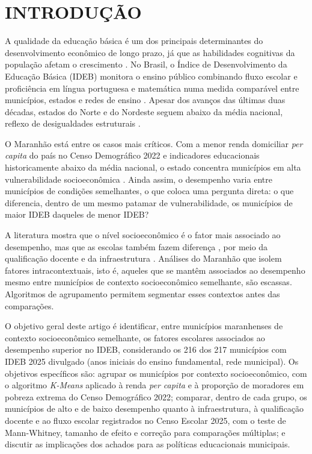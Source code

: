 \section{INTRODUÇÃO}
\label{sec:intro}

A qualidade da educação básica é um dos principais determinantes do desenvolvimento econômico de longo prazo, já que as habilidades cognitivas da população afetam o crescimento \parencite{hanushek2012}. No Brasil, o Índice de Desenvolvimento da Educação Básica (IDEB) monitora o ensino público combinando fluxo escolar e proficiência em língua portuguesa e matemática numa medida comparável entre municípios, estados e redes de ensino \parencite{fernandes2007}. Apesar dos avanços das últimas duas décadas, estados do Norte e do Nordeste seguem abaixo da média nacional, reflexo de desigualdades estruturais \parencite{inep2025}.

O Maranhão está entre os casos mais críticos. Com a menor renda domiciliar \textit{per capita} do país no Censo Demográfico 2022 e indicadores educacionais historicamente abaixo da média nacional, o estado concentra municípios em alta vulnerabilidade socioeconômica \parencite{ibge2022, inep2025}. Ainda assim, o desempenho varia entre municípios de condições semelhantes, o que coloca uma pergunta direta: o que diferencia, dentro de um mesmo patamar de vulnerabilidade, os municípios de maior IDEB daqueles de menor IDEB?

A literatura mostra que o nível socioeconômico é o fator mais associado ao desempenho, mas que as escolas também fazem diferença \parencite{coleman1966, brooke2008}, por meio da qualificação docente \parencite{rivkin2005} e da infraestrutura \parencite{alves2013, vasconcelos2021}. Análises do Maranhão que isolem fatores intracontextuais, isto é, aqueles que se mantêm associados ao desempenho mesmo entre municípios de contexto socioeconômico semelhante, são escassas. Algoritmos de agrupamento \parencite{romero2020, kalita2025} permitem segmentar esses contextos antes das comparações.

O objetivo geral deste artigo é identificar, entre municípios maranhenses de contexto socioeconômico semelhante, os fatores escolares associados ao desempenho superior no IDEB, considerando os 216 dos 217 municípios com IDEB 2025 divulgado (anos iniciais do ensino fundamental, rede municipal). Os objetivos específicos são: agrupar os municípios por contexto socioeconômico, com o algoritmo \textit{K-Means} aplicado à renda \textit{per capita} e à proporção de moradores em pobreza extrema do Censo Demográfico 2022; comparar, dentro de cada grupo, os municípios de alto e de baixo desempenho quanto à infraestrutura, à qualificação docente e ao fluxo escolar registrados no Censo Escolar 2025, com o teste de Mann-Whitney, tamanho de efeito e correção para comparações múltiplas; e discutir as implicações dos achados para as políticas educacionais municipais.

